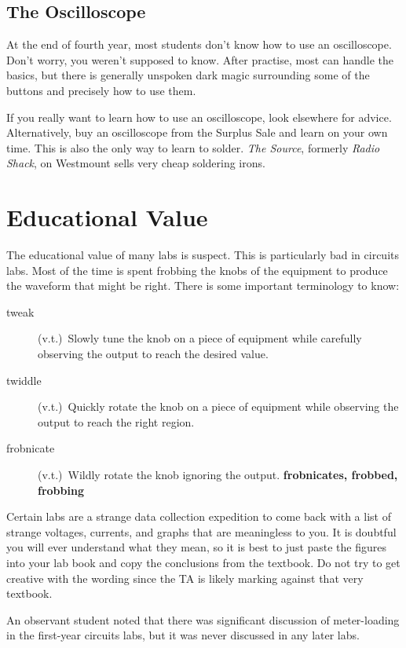\documentclass{book}
\begin{document}
\subsection{The Oscilloscope}
At the end of fourth year, most students don't know how to use an oscilloscope. Don't worry, you weren't supposed to know. After practise, most can handle the basics, but there is generally unspoken dark magic surrounding some of the buttons and precisely how to use them.

If you really want to learn how to use an oscilloscope, look elsewhere for advice. Alternatively, buy an oscilloscope from the Surplus Sale and learn on your own time. This is also the only way to learn to solder. \textsl{The Source}, formerly \textsl{Radio Shack}, on Westmount sells very cheap soldering irons.

\section{Educational Value}
The educational value of many labs is suspect. This is particularly bad in circuits labs. Most of the time is spent frobbing the knobs of the equipment to produce the waveform that might be right. There is some important terminology to know:

\begin{description}
\item[tweak] (v.t.)~Slowly tune the knob on a piece of equipment while carefully observing the output to reach the desired value.
\item[twiddle] (v.t.)~Quickly rotate the knob on a piece of equipment while observing the output to reach the right region.
\item[frobnicate] (v.t.)~Wildly rotate the knob ignoring the output. \textbf{frobnicates, frobbed, frobbing}
\end{description}

Certain labs are a strange data collection expedition to come back with a list of strange voltages, currents, and graphs that are meaningless to you. It is doubtful you will ever understand what they mean, so it is best to just paste the figures into your lab book and copy the conclusions from the textbook. Do not try to get creative with the wording since the TA is likely marking against that very textbook.

An observant student noted that there was significant discussion of meter-loading in the first-year circuits labs, but it was never discussed in any later labs.
\end{document}
